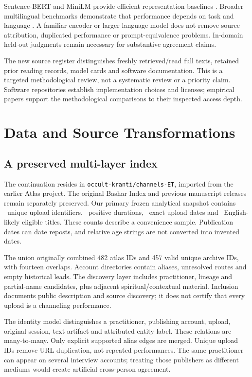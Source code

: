 Sentence-BERT and MiniLM provide efficient representation baselines \citep{reimers2019sentencebert,wang2020minilm}. Broader multilingual benchmarks demonstrate that performance depends on task and language \citep{muennighoff2023mteb,enevoldsen2025mmteb}. A familiar encoder or larger language model does not remove source attribution, duplicated performance or prompt-equivalence problems. In-domain held-out judgments remain necessary for substantive agreement claims.



The new source register distinguishes freshly retrieved/read full texts, retained prior reading records, model cards and software documentation. This is a targeted methodological review, not a systematic review or a priority claim. Software repositories establish implementation choices and licenses; empirical papers support the methodological comparisons to their inspected access depth.

\section{Data and Source Transformations}
\subsection{A preserved multi-layer index}
The continuation resides in \texttt{occult-kranti/channels-ET}, imported from the earlier Atlas project. The original Bashar Index and previous manuscript releases remain separately preserved. Our primary frozen analytical snapshot contains \UploadN\ unique upload identifiers, \DurationN\ positive durations, \DateN\ exact upload dates and \TitleN\ English-likely eligible titles. These counts describe a convenience sample. Publication dates can date reposts, and relative age strings are not converted into invented dates.

The union originally combined 482 atlas IDs and 457 valid unique archive IDs, with fourteen overlaps. Account directories contain aliases, unresolved routes and empty historical leads. The discovery layer includes practitioner, lineage and partial-name candidates, plus adjacent spiritual/contextual material. Inclusion documents public description and source discovery; it does not certify that every upload is a channeling performance.



The identity model distinguishes a practitioner, publishing account, upload, original session, text artifact and attributed entity label. These relations are many-to-many. Only explicit supported alias edges are merged. Unique upload IDs remove URL duplication, not repeated performances. The same practitioner can appear on several interview accounts; treating those publishers as different mediums would create artificial cross-person agreement.

